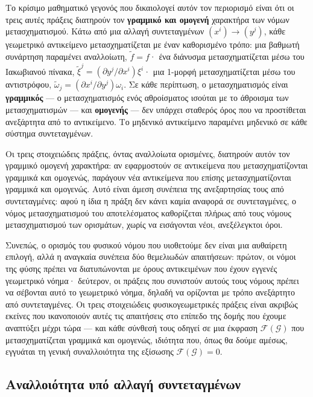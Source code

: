 \documentclass[11pt,a4paper,twoside,openright]{book}
\begin{document}
Το κρίσιμο μαθηματικό γεγονός που δικαιολογεί αυτόν τον περιορισμό είναι ότι οι τρεις αυτές πράξεις διατηρούν τον \textbf{γραμμικό και ομογενή} χαρακτήρα των νόμων μετασχηματισμού. Κάτω από μια αλλαγή συντεταγμένων $(x^i) \to (y^j)$, κάθε γεωμετρικό αντικείμενο μετασχηματίζεται με έναν καθορισμένο τρόπο: μια βαθμωτή συνάρτηση παραμένει αναλλοίωτη, $\tilde{f} = f$· ένα διάνυσμα μετασχηματίζεται μέσω του Ιακωβιανού πίνακα, $\tilde{\xi}^j = (\partial y^j / \partial x^i) \xi^i$· μια 1-μορφή μετασχηματίζεται μέσω του αντιστρόφου, $\tilde{\omega}_j = (\partial x^i / \partial y^j) \omega_i$. Σε κάθε περίπτωση, ο μετασχηματισμός είναι \textbf{γραμμικός} — ο μετασχηματισμός ενός αθροίσματος ισούται με το άθροισμα των μετασχηματισμών — και \textbf{ομογενής} — δεν υπάρχει σταθερός όρος που να προστίθεται ανεξάρτητα από το αντικείμενο. Το μηδενικό αντικείμενο παραμένει μηδενικό σε κάθε σύστημα συντεταγμένων.

Οι τρεις στοιχειώδεις πράξεις, όντας αναλλοίωτα ορισμένες, διατηρούν αυτόν τον γραμμικό ομογενή χαρακτήρα: αν εφαρμοστούν σε αντικείμενα που μετασχηματίζονται γραμμικά και ομογενώς, παράγουν νέα αντικείμενα που επίσης μετασχηματίζονται γραμμικά και ομογενώς. Αυτό είναι άμεση συνέπεια της ανεξαρτησίας τους από συντεταγμένες: αφού η ίδια η πράξη δεν κάνει καμία αναφορά σε συντεταγμένες, ο νόμος μετασχηματισμού του αποτελέσματος καθορίζεται πλήρως από τους νόμους μετασχηματισμού των ορισμάτων, χωρίς να εισάγονται νέοι, ανεξέλεγκτοι όροι.

Συνεπώς, ο ορισμός του φυσικού νόμου που υιοθετούμε δεν είναι μια αυθαίρετη επιλογή, αλλά η αναγκαία συνέπεια δύο θεμελιωδών απαιτήσεων: πρώτον, οι νόμοι της φύσης πρέπει να διατυπώνονται με όρους αντικειμένων που έχουν εγγενές γεωμετρικό νόημα· δεύτερον, οι πράξεις που συνιστούν αυτούς τους νόμους πρέπει να σέβονται αυτό το γεωμετρικό νόημα, δηλαδή να ορίζονται με τρόπο ανεξάρτητο από συντεταγμένες. Οι τρεις στοιχειώδεις φυσικογεωμετρικές πράξεις είναι ακριβώς εκείνες που ικανοποιούν αυτές τις απαιτήσεις στο επίπεδο της δομής που έχουμε αναπτύξει μέχρι τώρα — και κάθε σύνθεσή τους οδηγεί σε μια έκφραση $\mathcal{F}(\mathcal{G})$ που μετασχηματίζεται γραμμικά και ομογενώς, ιδιότητα που, όπως θα δούμε αμέσως, εγγυάται τη γενική συναλλοιότητα της εξίσωσης $\mathcal{F}(\mathcal{G}) = 0$.

\subsection{Αναλλοιότητα υπό αλλαγή συντεταγμένων}
\end{document}
